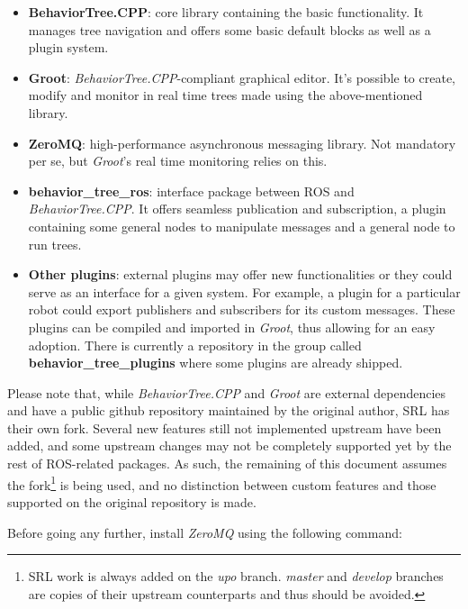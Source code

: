 \documentclass[a4paper,12pt]{article}
\begin{document}
\begin{itemize}
\item \textbf{BehaviorTree.CPP}: core library containing the basic functionality. It manages tree navigation and offers some basic default blocks as well as a plugin system.
\item \textbf{Groot}: \textit{BehaviorTree.CPP}-compliant graphical editor. It's possible to create, modify and monitor in real time trees made using the above-mentioned library.
\item \textbf{ZeroMQ}:  high-performance asynchronous messaging library. Not mandatory per se, but \textit{Groot}'s real time monitoring relies on this.
\item \textbf{behavior_tree_ros}: interface package between ROS and \textit{BehaviorTree.CPP}. It offers seamless publication and subscription, a plugin containing some general nodes to manipulate messages and a general node to run trees.
\item \textbf{Other plugins}: external plugins may offer new functionalities or they could serve as an interface for a given system. For example, a plugin for a particular robot could export publishers and subscribers for its custom messages. These plugins can be compiled and imported in \textit{Groot}, thus allowing for an easy adoption. There is currently a repository in the group called \textbf{behavior_tree_plugins} where some plugins are already shipped.
\end{itemize}

Please note that, while \textit{BehaviorTree.CPP} and \textit{Groot} are external dependencies and have a public github repository maintained by the original author, \ac{SRL} has their own fork. Several new features still not implemented upstream have been added, and some upstream changes may not be completely supported yet by the rest of ROS-related packages. As such, the remaining of this document assumes the fork\footnote{\ac{SRL} work is always added on the \textit{upo} branch. \textit{master} and \textit{develop} branches are copies of their upstream counterparts and thus should be avoided.} is being used, and no distinction between custom features and those supported on the original repository is made.

\noindent Before going any further, install \textit{ZeroMQ} using the following command:


\end{document}
